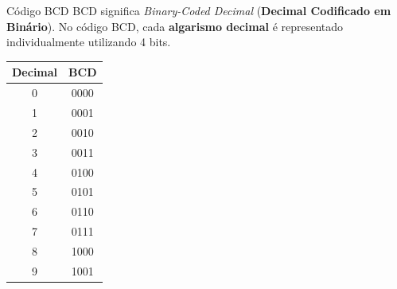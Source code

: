 
\begin{frame}{Código BCD}
    \small
     BCD significa \textit{Binary-Coded Decimal} (\textbf{Decimal Codificado em Binário}). No código BCD, cada \textbf{algarismo decimal} é representado
    individualmente utilizando 4 bits.

    \begin{center}
        \begin{tabular}{c|c}
            \textbf{Decimal} & \textbf{BCD} \\ \hline
            0 & 0000 \\
            1 & 0001 \\
            2 & 0010 \\
            3 & 0011 \\
            4 & 0100 \\
            5 & 0101 \\
            6 & 0110 \\
            7 & 0111 \\
            8 & 1000 \\
            9 & 1001
        \end{tabular}
    \end{center}

\end{frame}